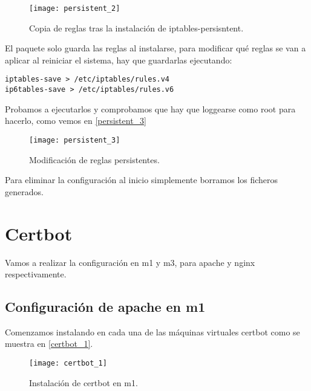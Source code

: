 \begin{figure}[h!]
\begin{center}
\caption{Copia de reglas tras la instalación de iptables-persisntent.}
\label{persistent_2}
\texttt{[image: persistent\_2]}
\end{center}
\end{figure}

El paquete solo guarda las reglas al instalarse, para modificar qué reglas se van a aplicar al reiniciar el sistema, hay que guardarlas ejecutando:

\begin{verbatim}
iptables-save > /etc/iptables/rules.v4
ip6tables-save > /etc/iptables/rules.v6
\end{verbatim}

Probamos a ejecutarlos y comprobamos que hay que loggearse como root para hacerlo, como vemos en \eqref{persistent_3}

\begin{figure}[h!]
\begin{center}
\caption{Modificación de reglas persistentes.}
\label{persistent_3}
\texttt{[image: persistent\_3]}
\end{center}
\end{figure}

Para eliminar la configuración al inicio simplemente borramos los ficheros generados.








\chapter{Certbot}

Vamos a realizar la configuración en m1 y m3, para apache y nginx respectivamente.

\section{Configuración de apache en m1}

Comenzamos instalando en cada una de las máquinas virtuales certbot como se muestra en \eqref{certbot_1}.

\begin{figure}[h!]
\begin{center}
\caption{Instalación de certbot en m1.}
\label{certbot_1}
\texttt{[image: certbot\_1]}
\end{center}
\end{figure}

